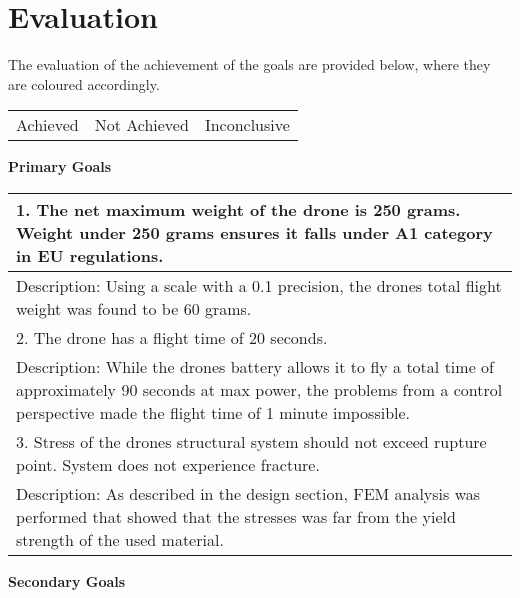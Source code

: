 \setlength{\parskip}{0pt}
\section*{Evaluation}
The evaluation of the achievement of the goals are provided below, 
where they are coloured accordingly.

\begin{center}

  \bigbreak

  \begin{tabular}{ c|c|c } 
      \color{ForestGreen}{Green} & \color{BrickRed}{Red} & \color{YellowOrange}{Orange} \\ 
      \hline
      Achieved & Not Achieved & Inconclusive \\  
  \end{tabular}

  \bigbreak
  \bigbreak
  \bigbreak
  \textbf{Primary Goals} 
  \bigbreak

  \begin{tabular}{| m{33em} |}
      \hline
      \color{ForestGreen}
      1. The net maximum weight of the drone is 250 grams. 
      Weight under 250 grams ensures it falls under A1 
      category in EU regulations. \\ 
      \hline
      Description:  Using a scale with a 0.1 precision, the drones total flight weight was found to be 60 grams.  \\ 
      \hline
      \hline
      \color{YellowOrange}
      2. The drone has a flight time of 20 seconds. \\ 
      \hline
      Description:  While the drones battery allows it to fly a total time of approximately 90 seconds at max power, the problems from a control perspective made 		      the flight time of 1 minute impossible.    \\ 
      \hline
      \hline
      \color{ForestGreen}
      3. Stress of the drones structural system should 
      not exceed rupture point. System does not experience 
      fracture. \\
      \hline
      Description:  As described in the design section, FEM analysis was performed that showed that the stresses was far from the yield strength of the used material. \\ 
      \hline
  \end{tabular}

  \bigbreak
  \textbf{Secondary Goals} 
  \bigbreak


\end{center}
